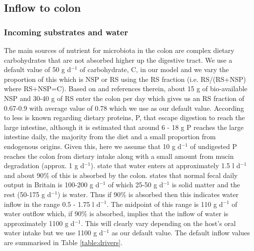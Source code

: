 \documentclass[a4paper]{article}
\begin{document}
\subsection*{Inflow to colon}
\subsubsection*{Incoming substrates and water}
The main sources of nutrient for microbiota in the colon are complex dietary carbohydrates that are not absorbed higher up the digestive tract. 
We use a default value of 50 g d$^{-1}$ of carbohydrate, C, in our model and we vary the proportion of this which is NSP or RS using the RS fraction (i.e. RS/(RS+NSP) where RS+NSP=C). 
Based on \cite{Cremer17} and references therein, about 15 g of bio-available NSP and 30-40 g of RS enter the colon per day which gives us an RS fraction of 0.67-0.9 with average value of 0.78 which we use as our default value.
According to \cite{yao} less is known regarding dietary proteins, P, that escape digestion to reach the large intestine, although it is estimated that around 6 - 18 g P reaches the large intestine daily, the majority from the diet and a small proportion from endogenous origins.
Given this, here we assume that 10 g d$^{-1}$ of undigested P reaches the colon from dietary intake along with a small amount from mucin degradation (approx. 1  g d$^{-1}$).
\cite{Phillips} state that water enters at approximately 1.5 l d$^{-1}$  and about 90\% of this is absorbed by the colon.
\cite{StephenCummings} states that normal fecal daily output in Britain is 100-200 g d$^{-1}$ of which 25-50 g d$^{-1}$ is solid matter and the rest (50-175 g d$^{-1}$) is water. Thus if 90\% is absorbed then this indicates water inflow in the range 0.5 - 1.75 l d$^{-1}$. 
The midpoint of this range is 110 g d$^{-1}$ of water outflow which, if 90\% is absorbed, implies that the inflow of water is approximately 1100 g d$^{-1}$. This will clearly vary depending on the host's oral water intake but we use 1100 g d$^{-1}$ as our default value.
The default inflow values are summarised in Table \ref{table:drivers}.
\end{document}
